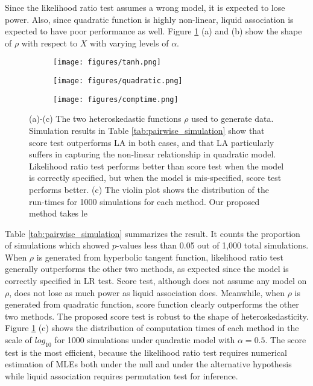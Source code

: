 \documentclass[aoas,preprint]{imsart}
\numberwithin{equation}{section}
\theoremstyle{plain}
\begin{document}
Since the likelihood ratio test assumes a wrong model, it is expected to lose power. Also, since quadratic function is highly non-linear, liquid association is expected to have poor performance as well. Figure \ref{fig:sim} (a) and (b) show the shape of $\rho$ with respect to $X$ with varying levels of $\alpha$. \\
\begin{figure}
     \begin{subfigure}[b]{0.3\textwidth}
         \texttt{[image: figures/tanh.png]}
         \caption{}
     \end{subfigure}
     \begin{subfigure}[b]{0.3\textwidth}
         \texttt{[image: figures/quadratic.png]}
         \caption{}
     \end{subfigure}
     \begin{subfigure}[b]{0.3\textwidth}
         \texttt{[image: figures/comptime.png]}
         \caption{}
     \end{subfigure}
        \caption{\label{fig:sim} (a)-(c) The two heteroskedastic functions $\rho$ used to generate data. Simulation results in Table \ref{tab:pairwise_simulation} show that score test outperforms LA in both cases, and that LA particularly suffers in capturing the non-linear relationship in quadratic model. Likelihood ratio test performs better than score test when the model is correctly specified, but when the model is mis-specified, score test performs better. (c) The violin plot shows the distribution of the run-times for 1000 simulations for each method. Our proposed method takes le}
\end{figure}

Table \ref{tab:pairwise_simulation} summarizes the result. It counts the proportion of simulations which showed $p$-values less than 0.05 out of 1,000 total simulations. When $\rho$ is generated from hyperbolic tangent function, likelihood ratio test generally outperforms the other two methods, as expected since the model is correctly specified in LR test. Score test, although does not assume any model on $\rho$, does not lose as much power as liquid association does. Meanwhile, when $\rho$ is generated from quadratic function, score function clearly outperforms the other two methods. The proposed score test is robust to the shape of heteroskedasticity. Figure \ref{fig:sim} (c) shows the distribution of computation times of each method in the scale of $log_{10}$ for 1000 simulations under quadratic model with $\alpha = 0.5$. The score test is the most efficient, because the likelihood ratio test requires numerical estimation of MLEs both under the null and under the alternative hypothesis while liquid association requires permutation test for inference. 
\end{document}
